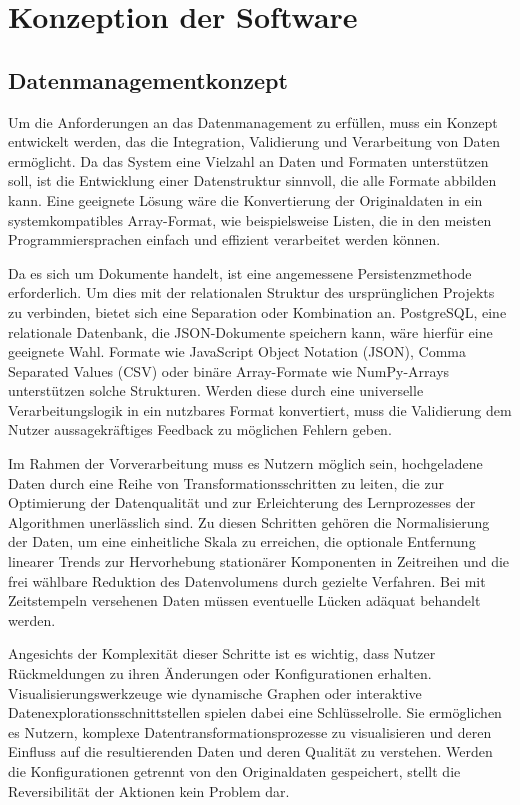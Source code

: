 \section{Konzeption der Software}
\subsection{Datenmanagementkonzept}
Um die Anforderungen an das Datenmanagement zu erfüllen, muss ein Konzept entwickelt werden, das die Integration, Validierung und Verarbeitung von Daten ermöglicht. Da das System eine Vielzahl an Daten und Formaten unterstützen soll, 
ist die Entwicklung einer Datenstruktur sinnvoll, die alle Formate abbilden kann. Eine geeignete Lösung wäre die Konvertierung der Originaldaten in ein systemkompatibles Array-Format, wie beispielsweise Listen, die in den meisten 
Programmiersprachen einfach und effizient verarbeitet werden können.

Da es sich um Dokumente handelt, ist eine angemessene Persistenzmethode erforderlich. Um dies mit der relationalen Struktur des ursprünglichen Projekts zu verbinden, bietet sich eine Separation oder Kombination an. PostgreSQL, eine relationale Datenbank, 
die JSON-Dokumente speichern kann, wäre hierfür eine geeignete Wahl. Formate wie JavaScript Object Notation (JSON), Comma Separated Values (CSV) oder binäre Array-Formate wie NumPy-Arrays unterstützen solche Strukturen. Werden diese durch eine universelle 
Verarbeitungslogik in ein nutzbares Format konvertiert, muss die Validierung dem Nutzer aussagekräftiges Feedback zu möglichen Fehlern geben.

Im Rahmen der Vorverarbeitung muss es Nutzern möglich sein, hochgeladene Daten durch eine Reihe von Transformationsschritten zu leiten, die zur Optimierung der Datenqualität und zur 
Erleichterung des Lernprozesses der Algorithmen unerlässlich sind. Zu diesen Schritten gehören die Normalisierung der Daten, um eine einheitliche Skala zu erreichen, die optionale Entfernung linearer Trends zur 
Hervorhebung stationärer Komponenten in Zeitreihen und die frei wählbare Reduktion des Datenvolumens durch gezielte Verfahren. Bei mit Zeitstempeln versehenen Daten müssen eventuelle Lücken adäquat behandelt werden.

Angesichts der Komplexität dieser Schritte ist es wichtig, dass Nutzer Rückmeldungen zu ihren Änderungen oder Konfigurationen erhalten. Visualisierungswerkzeuge wie dynamische Graphen oder interaktive 
Datenexplorationsschnittstellen spielen dabei eine Schlüsselrolle. Sie ermöglichen es Nutzern, komplexe Datentransformationsprozesse zu visualisieren und deren Einfluss auf die 
resultierenden Daten und deren Qualität zu verstehen. Werden die Konfigurationen getrennt von den Originaldaten gespeichert, stellt die Reversibilität der Aktionen kein Problem dar.

